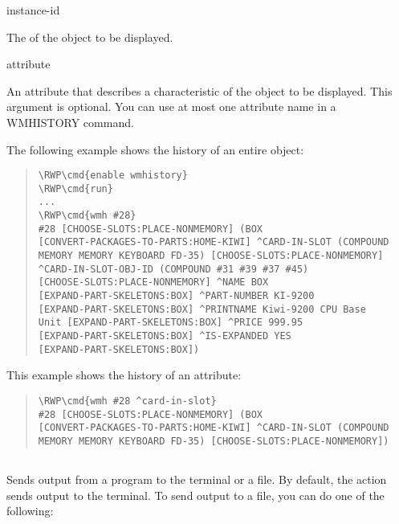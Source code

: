{{\begin{arguments}
\item[instance-id]

  The  of the object to be displayed.

\item[attribute]

  An attribute that describes a characteristic of the object to be
  displayed. This argument is optional. You can use at most one
  attribute name in a WMHISTORY command.
\end{arguments}

\Example

The following example shows the history of an entire object:

\begin{quote}
\begin{Verbatim}[commandchars=\\\{\}]
\RWP\cmd{enable wmhistory}
\RWP\cmd{run}
...
\RWP\cmd{wmh #28}
#28 [CHOOSE-SLOTS:PLACE-NONMEMORY] (BOX
[CONVERT-PACKAGES-TO-PARTS:HOME-KIWI] ^CARD-IN-SLOT (COMPOUND
MEMORY MEMORY KEYBOARD FD-35) [CHOOSE-SLOTS:PLACE-NONMEMORY]
^CARD-IN-SLOT-OBJ-ID (COMPOUND #31 #39 #37 #45)
[CHOOSE-SLOTS:PLACE-NONMEMORY] ^NAME BOX
[EXPAND-PART-SKELETONS:BOX] ^PART-NUMBER KI-9200
[EXPAND-PART-SKELETONS:BOX] ^PRINTNAME Kiwi-9200 CPU Base
Unit [EXPAND-PART-SKELETONS:BOX] ^PRICE 999.95
[EXPAND-PART-SKELETONS:BOX] ^IS-EXPANDED YES
[EXPAND-PART-SKELETONS:BOX])
\end{Verbatim}
\end{quote}

This example shows the history of an attribute:

\begin{quote}
\begin{Verbatim}[commandchars=\\\{\}]
\RWP\cmd{wmh #28 ^card-in-slot}
#28 [CHOOSE-SLOTS:PLACE-NONMEMORY] (BOX
[CONVERT-PACKAGES-TO-PARTS:HOME-KIWI] ^CARD-IN-SLOT (COMPOUND
MEMORY MEMORY KEYBOARD FD-35) [CHOOSE-SLOTS:PLACE-NONMEMORY])
\end{Verbatim}
\end{quote}

\subsection{}

Sends output from a program to the terminal or a file. By
default, the  action sends output to the terminal. To
send output to a file, you can do one of the following:

}}
